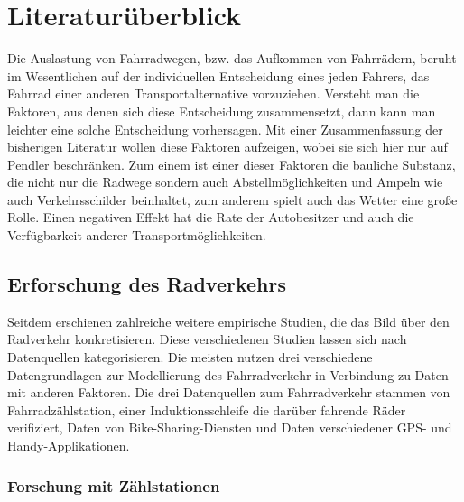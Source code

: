 \documentclass[a4paper,12pt]{thesis}
\begin{document}
\chapter{Literaturüberblick}

Die Auslastung von Fahrradwegen, bzw. das Aufkommen von Fahrrädern, beruht im Wesentlichen auf der individuellen Entscheidung eines jeden Fahrers, das Fahrrad einer anderen Transportalternative vorzuziehen. Versteht man die Faktoren, aus denen sich diese Entscheidung zusammensetzt, dann kann man leichter eine solche Entscheidung vorhersagen. Mit einer Zusammenfassung der bisherigen Literatur wollen \cite{Heinen2010} diese Faktoren aufzeigen, wobei sie sich hier nur auf Pendler beschränken. Zum einem ist einer dieser Faktoren die bauliche Substanz, die nicht nur die Radwege sondern auch Abstellmöglichkeiten und Ampeln wie auch Verkehrsschilder beinhaltet, zum anderem spielt auch das Wetter eine große Rolle. Einen negativen Effekt hat die Rate der Autobesitzer und auch die Verfügbarkeit anderer Transportmöglichkeiten.\\

\section{Erforschung des Radverkehrs}

Seitdem erschienen zahlreiche weitere empirische Studien, die das Bild über den Radverkehr konkretisieren. Diese verschiedenen Studien lassen sich nach Datenquellen kategorisieren. Die meisten nutzen drei verschiedene Datengrundlagen zur Modellierung des Fahrradverkehr in Verbindung zu Daten mit anderen Faktoren. Die drei Datenquellen zum Fahrradverkehr stammen von Fahrradzählstation, einer Induktionsschleife die darüber fahrende Räder verifiziert, Daten von Bike-Sharing-Diensten und Daten verschiedener GPS- und Handy-Applikationen.\\

\subsection{Forschung mit Zählstationen}
\end{document}

